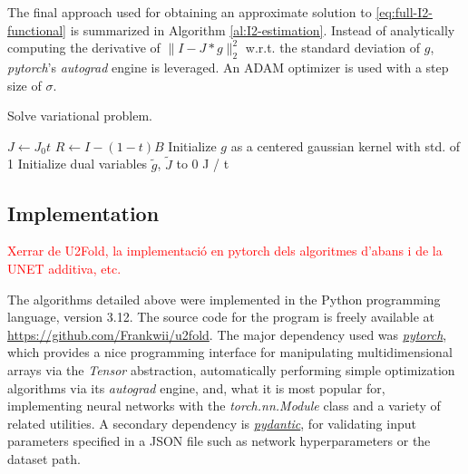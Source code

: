 \documentclass[twocolumn,twoside,a4paper,10pt]{IEEEtran}
\newcommand{\Frank}[1]{\textcolor{red}{#1}}
\begin{document}
The final approach used for obtaining an approximate solution to \cref{eq:full-I2-functional} is summarized in Algorithm \ref{al:I2-estimation}. Instead of analytically computing the derivative of \(\|I-J\ast g\|_2^2\) w.r.t. the standard deviation of \(g\), \textit{pytorch}'s \textit{autograd} engine is leveraged. An ADAM optimizer is used with a step size of \(\sigma\).

\begin{algorithm}\caption{Solve variational problem.}
\label{al:I2-estimation}
\(J\gets J_0t\)\;
\(R\gets I - (1-t)B\)\;
Initialize \(g\) as a centered gaussian kernel with std. of 1\;
Initialize dual variables \(\tilde{g}\), \(\tilde{J}\) to 0\;
\Return J / t
\end{algorithm}

\subsection{Implementation}
\Frank{Xerrar de U2Fold, la implementació en pytorch dels algoritmes d'abans i de la UNET additiva, etc.}

The algorithms detailed above were implemented in the Python programming
language, version 3.12. The source code for the program is freely available at \href{https://github.com/Frankwii/u2fold}{https://github.com/Frankwii/u2fold}.
The major dependency used was \href{https://pytorch.org/}{\textit{pytorch}}, which
provides a nice programming interface for manipulating multidimensional arrays 
via the \textit{Tensor} abstraction, automatically performing simple
optimization algorithms via its \textit{autograd} engine, and, what it is most
popular for, implementing neural networks with the \textit{torch.nn.Module}
class and a variety of related utilities. A secondary dependency is
\href{https://pydantic.com.cn/en/}{\textit{pydantic}}, for validating input parameters specified in a JSON file
such as network hyperparameters or the dataset path.
\end{document}

